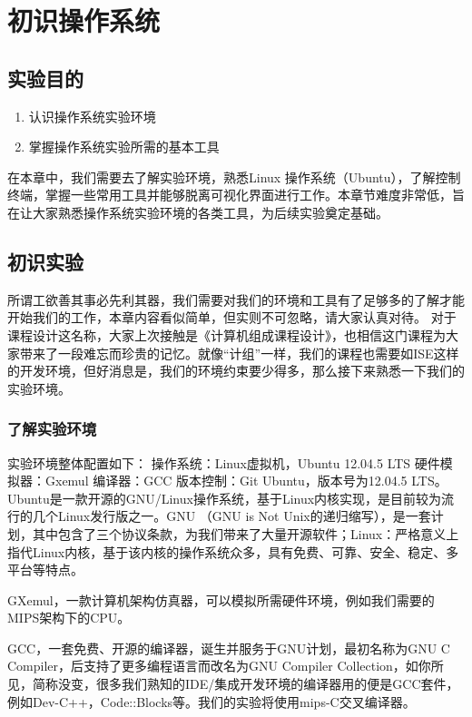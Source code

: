﻿\chapter{初识操作系统}

\section{实验目的}
  \begin{enumerate}
    \item 认识操作系统实验环境
    \item 掌握操作系统实验所需的基本工具
  \end{enumerate}
  
在本章中，我们需要去了解实验环境，熟悉Linux 操作系统（Ubuntu），了解控制终端，掌握一些常用工具并能够脱离可视化界面进行工作。本章节难度非常低，旨在让大家熟悉操作系统实验环境的各类工具，为后续实验奠定基础。

\section{初识实验}
所谓工欲善其事必先利其器，我们需要对我们的环境和工具有了足够多的了解才能开始我们的工作，本章内容看似简单，但实则不可忽略，请大家认真对待。
对于课程设计这名称，大家上次接触是《计算机组成课程设计》，也相信这门课程为大家带来了一段难忘而珍贵的记忆。就像“计组”一样，我们的课程也需要如ISE这样的开发环境，但好消息是，我们的环境约束要少得多，那么接下来熟悉一下我们的实验环境。

\subsection{了解实验环境}
实验环境整体配置如下：
	操作系统：Linux虚拟机，Ubuntu 12.04.5 LTS
	硬件模拟器：Gxemul
	编译器：GCC
	版本控制：Git
Ubuntu，版本号为12.04.5 LTS。Ubuntu是一款开源的GNU/Linux操作系统，基于Linux内核实现，是目前较为流行的几个Linux发行版之一。GNU （GNU is Not Unix的递归缩写），是一套计划，其中包含了三个协议条款，为我们带来了大量开源软件；Linux：严格意义上指代Linux内核，基于该内核的操作系统众多，具有免费、可靠、安全、稳定、多平台等特点。

GXemul，一款计算机架构仿真器，可以模拟所需硬件环境，例如我们需要的MIPS架构下的CPU。

GCC，一套免费、开源的编译器，诞生并服务于GNU计划，最初名称为GNU C Compiler，后支持了更多编程语言而改名为GNU Compiler Collection，如你所见，简称没变，很多我们熟知的IDE/集成开发环境的编译器用的便是GCC套件，例如Dev-C++，Code::Blocks等。我们的实验将使用mips-C交叉编译器。

